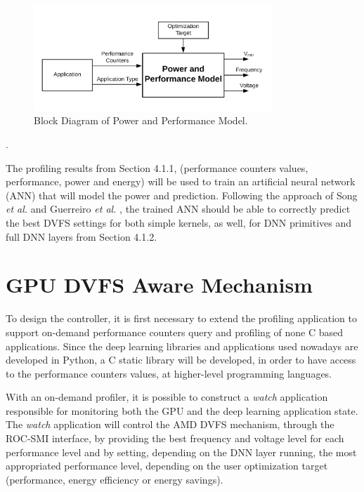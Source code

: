 \begin{figure}[!htb]
  \centering
  \includegraphics[width=0.8\textwidth]{Figures/Proposel/model.png}
  \caption[Controller]{Block Diagram of Power and Performance Model.}
  \label{fig:model}
\end{figure}. 

The profiling results from Section 4.1.1,  (performance counters values, performance, power and energy) will be used to train an artificial neural network (ANN) that will model the power and prediction. Following the approach of Song \textit{et al.} \cite{song_simplified_2013} and Guerreiro  \textit{et al.} \cite{guerreiro_modeling_2019}, the trained ANN should be able to correctly predict the best DVFS settings for both simple kernels, as well, for DNN primitives and full DNN layers from Section 4.1.2.

\section{GPU DVFS Aware Mechanism}
\label{section:DVFSaware}

To design the controller, it is first necessary to extend the profiling application to support on-demand performance counters query and profiling of none C based applications. Since the deep learning libraries and applications used nowadays are developed in Python, a C static library will be developed, in order to have access to the performance counters values, at higher-level programming languages.

With an on-demand profiler, it is possible to construct a \textit{watch} application responsible for monitoring both the GPU and the deep learning application state. The \textit{watch} application will control the AMD DVFS mechanism, through the ROC-SMI interface, by providing the best frequency and voltage level for each performance level and by setting, depending on the DNN layer running, the most appropriated performance level, depending on the user optimization target (performance, energy efficiency or energy savings).



